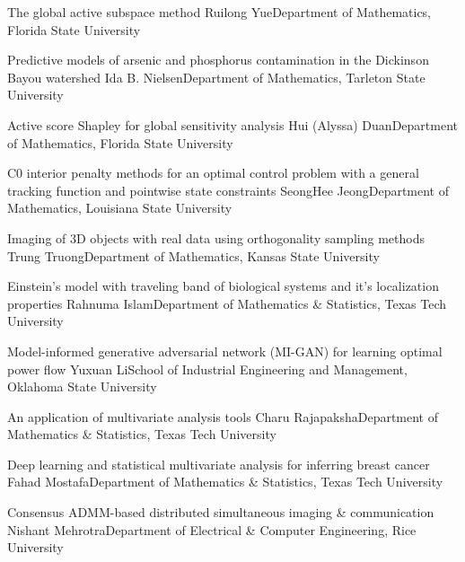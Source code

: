 \begin{postersPG}
\item\poster %
{The global active subspace method}
{Ruilong Yue}{Department of Mathematics, Florida State University}

\item\poster %
{Predictive models of arsenic and phosphorus contamination in the Dickinson Bayou watershed}
{Ida B. Nielsen}{Department of Mathematics, Tarleton State University}

\item\poster %
{Active score Shapley for global sensitivity analysis}
{Hui (Alyssa) Duan}{Department of Mathematics, Florida State University}

\item\poster %
{C0 interior penalty methods for an optimal control problem with a general tracking function and pointwise state constraints}
{SeongHee Jeong}{Department of Mathematics, Louisiana State University}

\item\poster %
{Imaging of 3D objects with real data using orthogonality sampling methods}
{Trung Truong}{Department of Mathematics, Kansas State University}

\item\poster %
{Einstein’s model with traveling band of biological systems and it’s localization properties}
{Rahnuma Islam}{Department of Mathematics \& Statistics, Texas Tech University}

\item\poster %
{Model-informed generative adversarial network (MI-GAN) for learning optimal power flow}
{Yuxuan Li}{School of Industrial Engineering and Management, Oklahoma State University}

\item\poster %
{An application of multivariate analysis tools}
{Charu Rajapaksha}{Department of Mathematics \& Statistics, Texas Tech University}

\item\poster %
{Deep learning and statistical multivariate analysis for inferring breast cancer}
{Fahad Mostafa}{Department of Mathematics \& Statistics, Texas Tech University}

\item\poster %
{Consensus ADMM-based distributed simultaneous imaging \& communication}
{Nishant Mehrotra}{Department of Electrical \& Computer Engineering, Rice University}


\end{postersPG}
